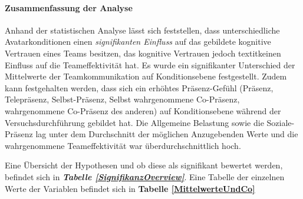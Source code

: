 \documentclass[a4paper,11pt]{article}%
\renewcommand{\\}{\vspace*{0.5\baselineskip} \newline}
\begin{document}
\paragraph{Zusammenfassung der Analyse}
Anhand der statistischen Analyse lässt sich feststellen, dass unterschiedliche Avatarkonditionen einen \textit{signifikanten Einfluss} auf das gebildete kognitive Vertrauen eines Teams besitzen, das kognitive Vertrauen jedoch textit{keinen Einfluss} auf die Teameffektivität hat. 
Es wurde ein signifikanter Unterschied der Mittelwerte der Teamkommunikation auf Konditionsebene festgestellt. Zudem kann festgehalten werden, dass sich ein erhöhtes Präsenz-Gefühl (Präsenz, Telepräsenz, Selbst-Präsenz, Selbst wahrgenommene Co-Präsenz, wahrgenommene Co-Präsenz des anderen) auf Konditionsebene während der Versuchsdurchführung gebildet hat. Die Allgemeine Belastung sowie die Soziale-Präsenz lag unter dem Durchschnitt der möglichen Anzugebenden Werte und die wahrgenommene Teameffektivität war überdurchschnittlich hoch.

Eine Übersicht der Hypothesen und ob diese als signifikant bewertet werden, befindet sich in \textbf{\textit{Tabelle \ref{SignifikanzOverview}}}. Eine Tabelle der einzelnen Werte der Variablen befindet sich in \textbf{Tabelle \ref{MittelwerteUndCo} }
\end{document}
